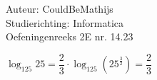 \documentclass[a4paper]{article}
\begin{document}
  
\noindent \large Auteur: CouldBeMathijs \\
\noindent \large Studierichting: Informatica\\
\noindent \large Oefeningenreeks 2E nr. 14.23\\

\medskip

\normalsize

$\log_{125} 25 = \dfrac{2}{3} \cdot \log_{125}\left( 25^{\tfrac{3}{2}}\right) = \dfrac{2}{3}$

\begin{thebibliography}{999}
\end{thebibliography}
\end{document}
